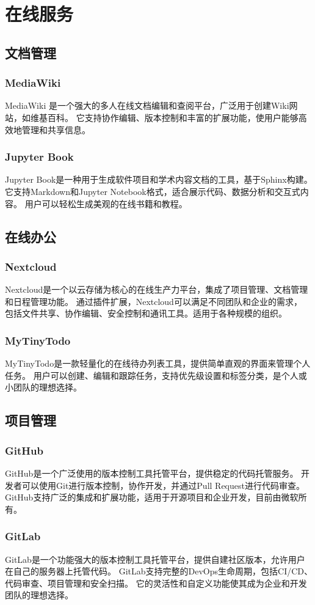\newpage
\section{在线服务}

\subsection{文档管理}

\subsubsection{MediaWiki}
MediaWiki \cite{Mediawiki2025} 是一个强大的多人在线文档编辑和查阅平台，广泛用于创建Wiki网站，如维基百科。
它支持协作编辑、版本控制和丰富的扩展功能，使用户能够高效地管理和共享信息。

\subsubsection{Jupyter Book}
Jupyter Book是一种用于生成软件项目和学术内容文档的工具，基于Sphinx构建。
它支持Markdown和Jupyter Notebook格式，适合展示代码、数据分析和交互式内容。
用户可以轻松生成美观的在线书籍和教程。

\subsection{在线办公}

\subsubsection{Nextcloud}
Nextcloud\cite{Nextcloud2025}是一个以云存储为核心的在线生产力平台，集成了项目管理、文档管理和日程管理功能。
通过插件扩展，Nextcloud可以满足不同团队和企业的需求，
包括文件共享、协作编辑、安全控制和通讯工具。适用于各种规模的组织。

\subsubsection{MyTinyTodo}
MyTinyTodo是一款轻量化的在线待办列表工具，提供简单直观的界面来管理个人任务。
用户可以创建、编辑和跟踪任务，支持优先级设置和标签分类，是个人或小团队的理想选择。

\subsection{项目管理}

\subsubsection{GitHub}
GitHub\cite{Github2025}是一个广泛使用的版本控制工具托管平台，提供稳定的代码托管服务。
开发者可以使用Git进行版本控制，协作开发，并通过Pull Request进行代码审查。
GitHub支持广泛的集成和扩展功能，适用于开源项目和企业开发，目前由微软所有。

\subsubsection{GitLab}
GitLab\cite{Gitlab2025}是一个功能强大的版本控制工具托管平台，提供自建社区版本，允许用户在自己的服务器上托管代码。
GitLab支持完整的DevOps生命周期，包括CI/CD、代码审查、项目管理和安全扫描。
它的灵活性和自定义功能使其成为企业和开发团队的理想选择。
